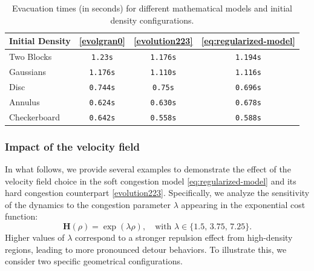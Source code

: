 \documentclass[final,reqno]{amsart}
\theoremstyle{plain}
\theoremstyle{definition}
\theoremstyle{remark}
\numberwithin{remark}{section}	%
\numberwithin{example}{section}	%
\newcommand{\he}{\mathbf{H}}
\begin{document}
\begin{table}[!ht]
    \centering
    \caption{Evacuation times (in seconds) for different mathematical models and initial density configurations.}
    \label{tab:models_evacuation}
    \begin{tabular}{|l|ccc|}
        \hline
        \textbf{Initial Density} & 
        \textbf{\eqref{evolgran0}} & 
        \textbf{\eqref{evolution223} } & 
        \textbf{\eqref{eq:regularized-model}} \\
        \hline
        \hline
        
        Two Blocks & 
        \texttt{1.23s} & 
        \texttt{1.176s} & 
        \texttt{1.194s} \\
        \hline
        
        Gaussians & 
        \texttt{1.176s} & 
        \texttt{1.110s} & 
        \texttt{1.116s} \\
        \hline

        
        Disc & 
        \texttt{0.744s} & 
        \texttt{0.75s} & 
        \texttt{0.696s} \\
        \hline
       
        
        Annulus & 
        \texttt{0.624s} & 
        \texttt{0.630s} & 
        \texttt{0.678s} \\
        \hline
       
        
        Checkerboard & 
        \texttt{0.642s} & 
        \texttt{0.558s} & 
        \texttt{0.588s} \\
        \hline
    \end{tabular}

\end{table}
\subsubsection{Impact of the velocity field } \label{subsection:impact_H}
In what follows, we provide several examples to demonstrate the effect of the velocity field choice in the soft congestion model \eqref{eq:regularized-model} and its hard congestion counterpart \eqref{evolution223}. Specifically, we analyze the sensitivity of the dynamics to the congestion parameter $\lambda$ appearing in the exponential cost function:
\begin{equation}
    \he(\rho) = \exp(\lambda\rho), \quad \text{with } \lambda \in \{1.5, \, 3.75, \, 7.25\}.
\end{equation}
Higher values of $\lambda$ correspond to a stronger repulsion effect from high-density regions, leading to more pronounced detour behaviors. To illustrate this, we consider two specific geometrical configurations.
\end{document}
